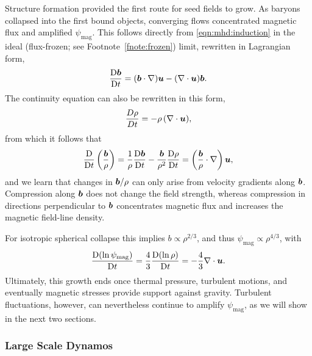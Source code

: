 Structure formation provided the first route for seed fields to grow. As baryons collapsed into the first bound objects, converging flows concentrated magnetic flux and amplified $\psi_\mathrm{mag}$. This follows directly from \autoref{eqn:mhd:induction} in the ideal (flux-frozen; see Footnote~\ref{fnote:frozen}) limit, rewritten in Lagrangian form,
\begin{align}
    \frac{\mathrm{D} \bm{b}}{\mathrm{D} t}
        = (\bm{b}\cdot\nabla) \bm{u}
            - (\nabla\cdot\bm{u}) \bm{b}
    .
\end{align}
The continuity equation can also be rewritten in this form,
\begin{align}
    \frac{D\rho}{Dt}
        = -\rho \, (\nabla\cdot\bm{u})
    ,
\end{align}
from which it follows that
\begin{align}
    \frac{\mathrm{D}}{\mathrm{D} t} \left( \frac{\bm{b}}{\rho} \right)
        = \frac{1}{\rho} \frac{\mathrm{D} \bm{b}}{\mathrm{D} t}
            - \frac{\bm{b}}{\rho^2} \frac{\mathrm{D} \rho}{\mathrm{D} t}
        = \left( \frac{\bm{b}}{\rho}\cdot\nabla \right) \bm{u}
    ,
\end{align}
and we learn that changes in $\bm{b} / \rho$ can only arise from velocity gradients along $\bm{b}$. Compression along $\bm{b}$ does not change the field strength, whereas compression in directions perpendicular to $\bm{b}$ concentrates magnetic flux and increases the magnetic field-line density.

For isotropic spherical collapse this implies $b \propto \rho^{2/3}$, and thus $\psi_\mathrm{mag} \propto \rho^{4/3}$, with
\begin{align}
    \frac{\mathrm{D} (\ln\psi_\mathrm{mag})}{\mathrm{D} t}
        = \frac{4}{3} \frac{\mathrm{D} (\ln\rho)}{\mathrm{D} t}
        = -\frac{4}{3} \nabla\cdot\bm{u}
    .
\end{align}
Ultimately, this growth ends once thermal pressure, turbulent motions, and eventually magnetic stresses provide support against gravity. Turbulent fluctuations, however, can nevertheless continue to amplify $\psi_\mathrm{mag}$, as we will show in the next two sections.

\subsubsection{Large Scale Dynamos}
\label{sec:evolve:lsd}

